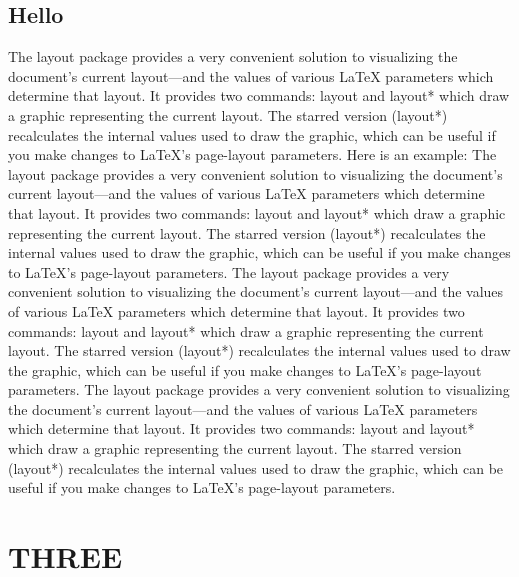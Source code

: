 \documentclass{bduMasters}
\begin{document}
\section{Hello}
The layout package provides a very convenient solution to visualizing the document's current layout—and the values of various LaTeX parameters which determine that layout. It provides two commands: layout and layout* which draw a graphic representing the current layout. The starred version (layout*) recalculates the internal values used to draw the graphic, which can be useful if you make changes to LaTeX's page-layout parameters. Here is an example:
The layout package provides a very convenient solution to visualizing the document's current layout—and the values of various LaTeX parameters which determine that layout. It provides two commands: layout and layout* which draw a graphic representing the current layout. The starred version (layout*) recalculates the internal values used to draw the graphic, which can be useful if you make changes to LaTeX's page-layout parameters.
The layout package provides a very convenient solution to visualizing the document's current layout—and the values of various LaTeX parameters which determine that layout. It provides two commands: layout and layout* which draw a graphic representing the current layout. The starred version (layout*) recalculates the internal values used to draw the graphic, which can be useful if you make changes to LaTeX's page-layout parameters.
The layout package provides a very convenient solution to visualizing the document's current layout—and the values of various LaTeX parameters which determine that layout. It provides two commands: layout and layout* which draw a graphic representing the current layout. The starred version (layout*) recalculates the internal values used to draw the graphic, which can be useful if you make changes to LaTeX's page-layout parameters.

\chapter{THREE}
\end{document}
